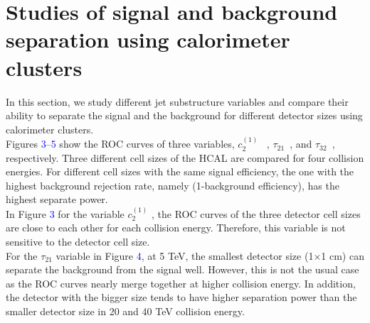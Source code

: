 \section{Studies of signal and background separation using calorimeter clusters}
In this section, we study different jet substructure variables and compare their ability to separate the signal and the background for different detector sizes using calorimeter clusters.\\

Figures \textcolor{blue}{3}--\textcolor{blue}{5} show the ROC curves of three variables, $c_2^{(1)}$~\cite{Larkoski:2013eya} , $\tau_{21}$~\cite{Thaler:2010tr}, and $\tau_{32}$~\cite{Thaler:2010tr}, respectively. Three different cell sizes of the HCAL are compared for four collision energies. For different cell sizes with the same signal efficiency, the one with the highest background rejection rate, namely (1-background efficiency), has the highest separate power.\\

In Figure \textcolor{blue}{3} for the variable $c_2^{(1)}$ , the ROC curves of the three detector cell sizes are close to each other for each collision energy. Therefore, this variable is not sensitive to the detector cell size.\\

For the $\tau_{21}$ variable in Figure \textcolor{blue}{4}, at 5 TeV, the smallest detector size (1$\times$1 cm) can separate the background from the signal well. However, this is not the usual case as the ROC curves nearly merge together at higher collision energy. In addition, the detector with the bigger size tends to have higher separation power than the smaller detector size in 20 and 40 TeV collision energy.\\

